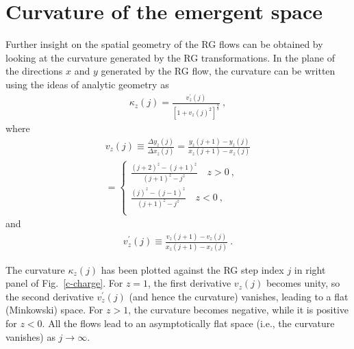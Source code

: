 \section{Curvature of the emergent space}
\label{curvature}
Further insight on the spatial geometry of the RG flows can be obtained by looking at the curvature generated by the RG transformations. In the plane of the directions \(x\) and \(y\) generated by the RG flow, the curvature can be written using the ideas of analytic geometry as
\begin{equation}\begin{aligned}
	\label{kappa}
	\kappa_{z}(j) = \frac{v^\prime_z(j)}{\left[1 + v_z(j)^2\right]^\frac{3}{2}}~,
\end{aligned}\end{equation}
where
\begin{equation}\begin{aligned}
	v_z(j) \equiv \frac{\Delta y_z(j)}{\Delta x_z(j)} = \frac{y_z(j+1) - y_z(j)}{x_z(j+1) - x_z(j)} \\
	= \begin{cases}
		\frac{\left(j+2\right)^z - \left(j+1\right)^z}{\left(j+1\right)^z - j^z} \quad  z > 0~,\\
		\frac{\left(j\right)^z - \left(j-1\right)^z}{\left(j+1\right)^z - j^z} \quad  z < 0~,\\
	\end{cases}
\end{aligned}\end{equation}
and
\begin{equation}\begin{aligned}
	v^\prime_z(j) \equiv \frac{v_z(j+1) - v_z(j)}{x_z(j+1) - x_z(j)}~.
\end{aligned}\end{equation}

The curvature $\kappa_{z}(j)$ has been plotted against the RG step index \(j\) in right panel of Fig.~\ref{c-charge}. For \(z=1\), the first derivative \(v_z(j)\) becomes unity, so the second derivative \(v^\prime_z(j)\) (and hence the curvature) vanishes, leading to a flat (Minkowski) space. For \(z>1\), the curvature becomes negative, while it is positive for \(z<0\). All the flows lead to an asymptotically flat space (i.e., the curvature vanishes) as \(j \to \infty\). 

